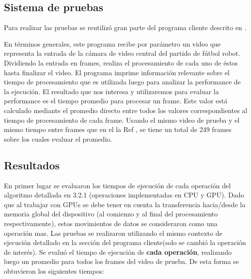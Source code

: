 \documentclass[a4paper,10pt]{report}
\begin{document}
 
 
 
 
 
 
 
 
 
 
 
 
 
 
\subsection{Sistema de pruebas}
Para realizar las pruebas se reutilizó gran parte del programa cliente descrito en \cite[capítulo 4]{Jaureguiberry}.

En términos generales, este programa recibe por parámetro un video que representa la entrada de la cámara de video central del partido de fútbol robot. 
Dividiendo la entrada en frames, realiza el procesamiento de cada uno de éstos hasta finalizar el video. El programa imprime información relevante sobre el tiempo de procesamiento que es utilizada luego para analizar la performance de la ejecución.
El resultado que nos interesa y utilizaremos para evaluar la performance es el tiempo promedio para procesar un frame. 
Este valor está calculado mediante el promedio directo entre todos los valores correspondientes al tiempo de procesamiento de cada frame. 
Usando el mismo video de prueba y el mismo tiempo entre frames que en el la Ref \cite{Jaureguiberry}, se tiene un total de 249 frames sobre los cuales evaluar el promedio.


\subsection{Resultados}



En primer lugar se evaluaron los tiempos de ejecución de cada operación del algoritmo detallada en 3.2.1 (operaciones implementadas en CPU y GPU).
Dado que al trabajar con GPUs se debe tener en cuenta la transferencia hacia/desde la memoria global del dispositivo (al comienzo y al final del procesamiento respectivamente), estos movimientos de datos se consideraron como una operación mas.
Las pruebas se realizaron utilizando el mismo contexto de ejecución detallado en la sección del programa cliente(solo se cambió la operación de interés). Se evaluó el tiempo de ejecución de \textbf{cada operación}, realizando luego un promedio para todos los frames del video de prueba.
De esta forma se obtuvieron los siguientes tiempos:
\end{document}

